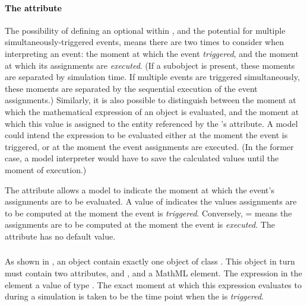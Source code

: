 \vspace*{-0.25ex}
\paragraph{\textcolor{black}{The  attribute}}
\label{sec:event-usevaluesfromtriggertime}

The possibility of defining an optional \Delay within \Event, and
the potential for multiple simultaneously-triggered events, means
there are two times to consider when interpreting an event: the
moment at which the event \emph{triggered}, and the moment at
which its assignments are \emph{executed}.  (If a \Delay subobject
is present, these moments are separated by simulation time.  If
multiple events are triggered simultaneously, these moments are
separated by the sequential execution of the event assignments.)
Similarly, it is also possible to distinguish between the moment at
which the mathematical expression of an \EventAssignment object is
evaluated, and the moment at which this value is assigned to the
entity referenced by the \EventAssignment's 
attribute.  A model could intend the \EventAssignment expression
to be evaluated either at the moment the event is triggered, or at
the moment the event assignments are executed.  (In the former case,
a model interpreter would have to save the calculated values until
the moment of execution.)

The attribute  allows a model to
indicate the moment at which the event's assignments are to be
evaluated.  A value of  indicates the values assignments
are to be computed at the moment the event is \emph{triggered}.
Conversely, = means the
assignments are to be computed at the moment the event is
\emph{executed}.  The attribute has no default value.


\vspace*{-1.75ex}
\subsubsection{}
\label{sec:trigger}
\label{sec:event-trigger}

As shown in , an \Event object  contain
exactly one object of class \Trigger.  This object in turn must
contain two attributes,  and
, and a MathML  element.
The expression in the  element  a
value of type .  The exact moment at which this
expression evaluates to  during a simulation is taken to
be the time point when the \Event is \emph{triggered}.

